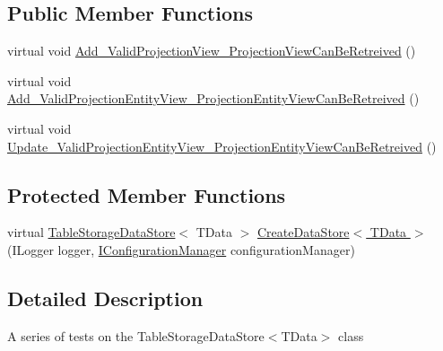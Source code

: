 \subsection*{Public Member Functions}
\begin{DoxyCompactItemize}
\item 
virtual void \hyperlink{classCqrs_1_1Azure_1_1BlobStorage_1_1Test_1_1Integration_1_1TableStorageDataStoreTests_a4d5cbb9f8690e2eff9529966e6816b5c}{Add\+\_\+\+Valid\+Projection\+View\+\_\+\+Projection\+View\+Can\+Be\+Retreived} ()
\item 
virtual void \hyperlink{classCqrs_1_1Azure_1_1BlobStorage_1_1Test_1_1Integration_1_1TableStorageDataStoreTests_acd703f5ee0699216338b5cd5e41d771a}{Add\+\_\+\+Valid\+Projection\+Entity\+View\+\_\+\+Projection\+Entity\+View\+Can\+Be\+Retreived} ()
\item 
virtual void \hyperlink{classCqrs_1_1Azure_1_1BlobStorage_1_1Test_1_1Integration_1_1TableStorageDataStoreTests_ae2ea908fde732d4466091b01597918c6}{Update\+\_\+\+Valid\+Projection\+Entity\+View\+\_\+\+Projection\+Entity\+View\+Can\+Be\+Retreived} ()
\end{DoxyCompactItemize}
\subsection*{Protected Member Functions}
\begin{DoxyCompactItemize}
\item 
virtual \hyperlink{classCqrs_1_1Azure_1_1BlobStorage_1_1DataStores_1_1TableStorageDataStore}{Table\+Storage\+Data\+Store}$<$ T\+Data $>$ \hyperlink{classCqrs_1_1Azure_1_1BlobStorage_1_1Test_1_1Integration_1_1TableStorageDataStoreTests_a76d6ef854f24e39f80de66e86cfa967c}{Create\+Data\+Store$<$ T\+Data $>$} (I\+Logger logger, \hyperlink{interfaceCqrs_1_1Configuration_1_1IConfigurationManager}{I\+Configuration\+Manager} configuration\+Manager)
\end{DoxyCompactItemize}


\subsection{Detailed Description}
A series of tests on the Table\+Storage\+Data\+Store$<$\+T\+Data$>$ class 



